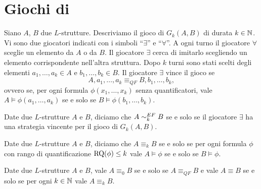 \section{Giochi di \EFl{}}
\label{sec:EF}
\begin{definizione}
 Siano $A$, $B$ due $L$-strutture. Descriviamo
 il gioco di \EFl{} $G_k(A,B)$ di durata $k \in \mathbb{N}$. Vi sono due giocatori
 indicati con i simboli ``$\exists$'' e ``$\forall$''. A ogni turno
 il giocatore $\forall$ sceglie un elemento da $A$ o da $B$. Il giocatore
 $\exists$ cerca di imitarlo scegliendo un elemento corrispondente nell'altra
 struttura. Dopo $k$ turni sono stati scelti degli elementi
 $a_1, \ldots, a_k \in A$ e $b_1, \ldots, b_k \in B$. Il giocatore $\exists$
 vince il gioco se
 \[ A, a_1, \ldots, a_k \equiv_{QF} B, b_1, \ldots, b_k,\]
 ovvero se, per ogni formula $\phi(x_1, \ldots, x_k)$ senza quantificatori, vale
 $A \models \phi(a_1, \ldots, a_k)$ se e solo se $B \models \phi(b_1, \ldots, b_k)$.
\end{definizione}

\begin{definizione}
 Date due $L$-strutture $A$ e $B$, diciamo che $A \sim^{EF}_k B$ se e solo se
 il giocatore $\exists$ ha una strategia vincente per il gioco di \EF{} $G_k(A,B)$.
\end{definizione}

\begin{definizione}
 Date due $L$-strutture $A$ e $B$, diciamo che $A \equiv_k B$ se e solo se
 per ogni formula $\phi$ con rango di quantificazione $\operatorname{RQ}(\phi) \leq k$ vale
 $A \models \phi$ se e solo se $B \models \phi$.
\end{definizione}

\begin{osservazione}
 Date due $L$-strutture $A$ e $B$, vale $A \equiv_0 B$ se e solo se
 $A \equiv_{QF} B$ e vale $A \equiv B$ se e solo se per ogni $k \in \mathbb{N}$ vale
 $A \equiv_k B$.
\end{osservazione}

